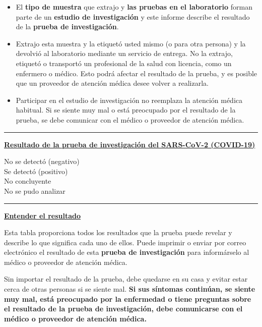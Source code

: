 \documentclass[10pt]{article}
\newcommand{\PageLine}{\rule{\textwidth}{0.25mm}}
\begin{document}
\begin{itemize}
\item

  El \textbf{tipo de muestra} que extrajo y \textbf{las pruebas en el
  laboratorio} forman parte de un \textbf{estudio de investigación} y este
  informe describe el resultado de la \textbf{prueba de investigación}.

\item

  Extrajo esta muestra y la etiquetó usted mismo (o para otra persona) y la
  devolvió al laboratorio mediante un servicio de entrega. No la extrajo,
  etiquetó o transportó un profesional de la salud con licencia, como un
  enfermero o médico. Esto podrá afectar el resultado de la prueba, y es posible
  que un proveedor de atención médica desee volver a realizarla.

\item

  Participar en el estudio de investigación no reemplaza la atención médica
  habitual. Si se siente muy mal o está preocupado por el resultado de la
  prueba, se debe comunicar con el médico o proveedor de atención médica.

\end{itemize}

\bigskip
\PageLine

\large \underline{\textbf{Resultado de la prueba de investigación del SARS-CoV-2
  (COVID-19)}}

No se detectó (negativo)\\
Se detectó (positivo)\\
No concluyente\\
No se pudo analizar\\

\PageLine
\bigskip

\large \underline{\textbf{Entender el resultado}}

Esta tabla proporciona todos los resultados que la prueba puede revelar y
describe lo que significa cada uno de ellos. Puede imprimir o enviar por correo
electrónico el resultado de esta \textbf{prueba de investigación} para
informárselo al médico o proveedor de atención médica.

Sin importar el resultado de la prueba, debe quedarse en su casa y evitar estar
cerca de otras personas si se siente mal. \textbf{Si sus síntomas continúan, se
siente muy mal, está preocupado por la enfermedad o tiene preguntas sobre el
resultado de la prueba de investigación, debe comunicarse con el médico o
proveedor de atención médica.}
\end{document}
